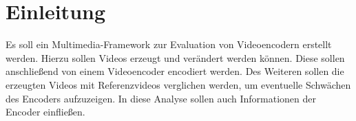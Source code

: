 \section{Einleitung}

Es soll ein Multimedia-Framework zur Evaluation von Videoencodern erstellt werden. Hierzu sollen Videos erzeugt und verändert werden können. Diese sollen anschließend von einem Videoencoder encodiert werden. Des Weiteren sollen die erzeugten Videos mit Referenzvideos verglichen werden, um eventuelle Schwächen des Encoders aufzuzeigen. In diese Analyse sollen auch Informationen der Encoder einfließen.
